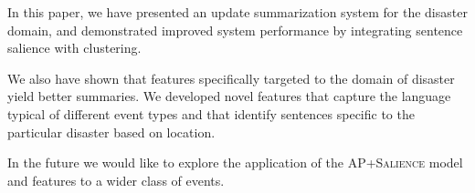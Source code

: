 In this paper, we have presented an update summarization system for the 
disaster domain, and demonstrated improved system performance by integrating 
sentence salience with clustering.


We also have shown that features specifically targeted to the domain of 
disaster yield better summaries. We developed novel features that capture the 
language typical of different event types and that identify sentences specific
to the particular disaster based on location.


In the future we would like to explore the application of the 
\textsc{AP+Salience}
model and features to a wider class of events. 
